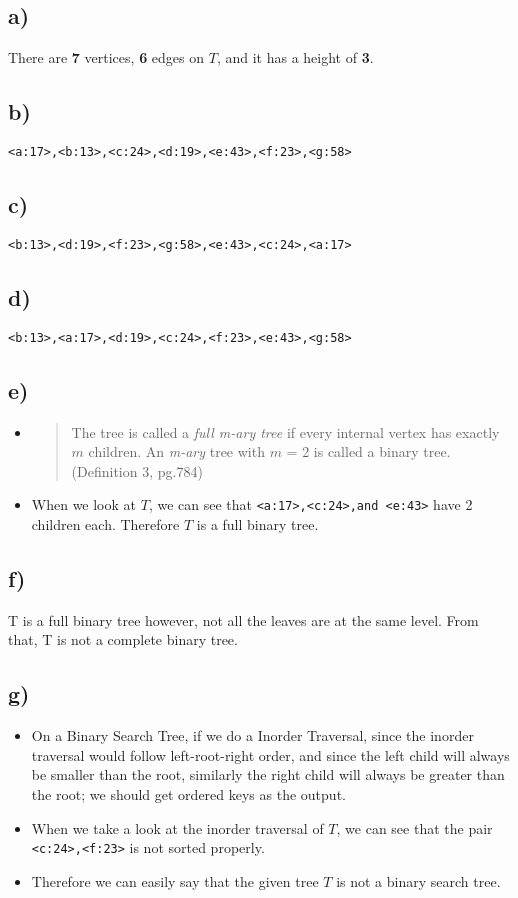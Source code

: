 \documentclass[11pt]{article}
\begin{document}
\subsection*{a)}
There are \textbf{7} vertices, \textbf{6} edges on $T$, and it has a height of \textbf{3}.
\subsection*{b)}
\texttt{<a:17>,<b:13>,<c:24>,<d:19>,<e:43>,<f:23>,<g:58>}
\subsection*{c)}
\texttt{<b:13>,<d:19>,<f:23>,<g:58>,<e:43>,<c:24>,<a:17>}
\subsection*{d)}
\texttt{<b:13>,<a:17>,<d:19>,<c:24>,<f:23>,<e:43>,<g:58>}
\subsection*{e)}
\begin{itemize}
    \item
    \begin{quote}
        The tree is called a \textit{full m-ary tree} if every internal vertex has exactly $m$ children. An \textit{m-ary} tree with $m$ = 2 is called a binary tree.(Definition 3, pg.784)
    \end{quote}
    \item When we look at $T$, we can see that \texttt{<a:17>,<c:24>,and <e:43>} have 2 children each. Therefore $T$ is a full binary tree.
\end{itemize}    
\subsection*{f)}
T is a full binary tree however, not all the leaves are at the same level. From that, T is not a complete binary tree.\\
\subsection*{g)}
\begin{itemize}
    \item On a Binary Search Tree, if we do a Inorder Traversal,  since the inorder traversal would follow left-root-right order, and since the left child will always be smaller than the root, similarly the right child will always be greater than the root; we should get ordered keys as the output.
    \item When we take a look at the inorder traversal of $T$, we can see that the pair \texttt{<c:24>,<f:23>} is not sorted properly. 
    \item Therefore we can easily say that the given tree $T$ is not a binary search tree.
\end{itemize}
\end{document}
